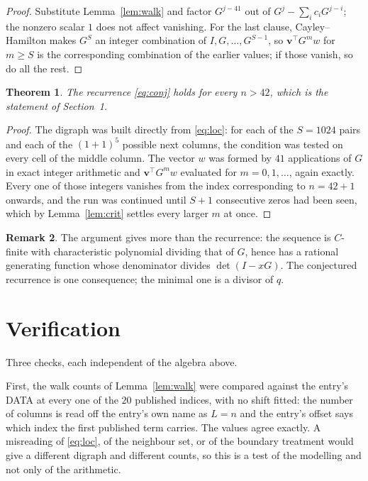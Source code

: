 \documentclass[11pt,a4paper]{article}
\theoremstyle{plain}
\newtheorem{theorem}{Theorem}
\theoremstyle{definition}
\newtheorem{remark}[theorem]{Remark}
\begin{document}
\begin{proof}
Substitute Lemma~\ref{lem:walk} and factor $G^{j-41}$ out of
$G^{j}-\sum_ic_iG^{j-i}$; the nonzero scalar $1$ does not affect
vanishing. For the last clause, Cayley--Hamilton makes $G^{S}$ an integer combination of
$I,G,\dots,G^{S-1}$, so $\mathbf{v}^{\!\top}G^{m}w$ for $m\ge S$ is the corresponding
combination of the earlier values; if those vanish, so do all the rest.
\end{proof}

\begin{theorem}
The recurrence \eqref{eq:conj} holds for every $n>42$, which is the statement of
Section~1.
\end{theorem}

\begin{proof}
The digraph was built directly from \eqref{eq:loc}: for each of the $S=1024$ pairs and each
of the $(1+1)^{5}$ possible next columns, the condition was tested on every cell of
the middle column. The vector $w$ was formed by $41$ applications of $G$ in exact integer
arithmetic and $\mathbf{v}^{\!\top}G^{m}w$ evaluated for $m=0,1,\dots$, again exactly.
Every one of those integers vanishes from the index corresponding to $n=42+1$ onwards,
and the run was continued until $S+1$ consecutive zeros had been seen, which by
Lemma~\ref{lem:crit} settles every larger $m$ at once.
\end{proof}

\begin{remark}
The argument gives more than the recurrence: the sequence is $C$-finite with characteristic
polynomial dividing that of $G$, hence has a rational generating function whose denominator
divides $\det(I-xG)$. The conjectured recurrence is one consequence; the minimal one is a
divisor of $q$.
\end{remark}

\section{Verification}

Three checks, each independent of the algebra above.

First, the walk counts of Lemma~\ref{lem:walk} were compared against the entry's DATA at
every one of the $20$ published indices, with no shift fitted: the number of columns is
read off the entry's own name as $L=n$ and the entry's offset says which index the first
published term carries. The values agree exactly. A misreading of \eqref{eq:loc}, of the
neighbour set, or of the boundary treatment would give a different digraph and different
counts, so this is a test of the modelling and not only of the arithmetic.
\end{document}
